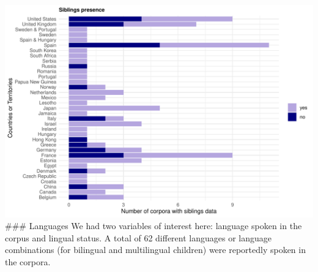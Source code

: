 \documentclass[
  man,floatsintext]{apa6}
\begin{document}
\includegraphics{CHILDES_short_files/figure-latex/figure6-1.pdf}
\#\#\# Languages
We had two variables of interest here: language spoken in the corpus and lingual status. A total of 62 different languages or language combinations (for bilingual and multilingual children) were reportedly spoken in the corpora.
\end{document}
